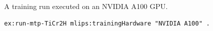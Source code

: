 A training run executed on an NVIDIA A100 GPU.
\begin{lstlisting}[language=turtle]
ex:run-mtp-TiCr2H mlips:trainingHardware "NVIDIA A100" .
\end{lstlisting}
